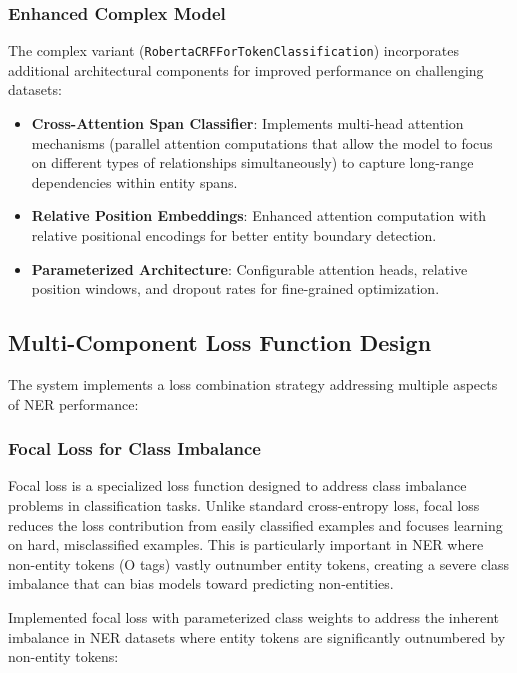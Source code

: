 \documentclass[a4paper]{usiinfbachelorproject}
\begin{document}
\subsubsection{Enhanced Complex Model}

The complex variant (\texttt{RobertaCRFForTokenClassification}) incorporates additional architectural components for improved performance on challenging datasets:

\begin{itemize}
    \item \textbf{Cross-Attention Span Classifier}: Implements multi-head attention mechanisms (parallel attention computations that allow the model to focus on different types of relationships simultaneously) to capture long-range dependencies within entity spans\cite{Tan_Qiu_Chen_Wang_Huang_2020}.
    \item \textbf{Relative Position Embeddings}: Enhanced attention computation with relative positional encodings for better entity boundary detection.
    \item \textbf{Parameterized Architecture}: Configurable attention heads, relative position windows, and dropout rates for fine-grained optimization.
\end{itemize}

\subsection{Multi-Component Loss Function Design}

The system implements a loss combination strategy addressing multiple aspects of NER performance:

\subsubsection{Focal Loss for Class Imbalance}

Focal loss is a specialized loss function designed to address class imbalance problems in classification tasks\cite{9624339}. Unlike standard cross-entropy loss, focal loss reduces the loss contribution from easily classified examples and focuses learning on hard, misclassified examples. This is particularly important in NER where non-entity tokens (O tags) vastly outnumber entity tokens, creating a severe class imbalance that can bias models toward predicting non-entities.

Implemented focal loss with parameterized class weights to address the inherent imbalance in NER datasets where entity tokens are significantly outnumbered by non-entity tokens:
\end{document}
